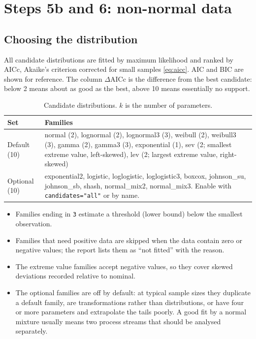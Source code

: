 \documentclass[a4paper,11pt,oneside,openany,parskip=half-,headings=standardclasses,toc=flat,numbers=noenddot]{scrbook}
\newcommand{\thead}[1]{{\sffamily\bfseries\footnotesize #1}}
\newcommand{\code}[1]{\texttt{\begingroup\def\_{\textunderscore\allowbreak}#1\endgroup}}
\begin{document}
\section{Steps 5b and 6: non-normal data}

\subsection{Choosing the distribution}\label{sec:aicc}
All candidate distributions are fitted by maximum likelihood and ranked by AICc, Akaike's criterion
corrected for small samples \cite{burnham} \eqref{eq:aicc}. AIC and BIC are shown for reference. The column $\Delta$AICc is the
difference from the best candidate: below 2 means about as good as the best, above 10 means essentially
no support.

\begin{table}[!htp]
\caption{Candidate distributions. $k$ is the number of parameters.}\label{tab:dists}
\small
\begin{tabularx}{\textwidth}{@{}P{15mm}L@{}}
\toprule
\thead{Set} & \thead{Families}\\
\midrule
Default (10) & normal (2), lognormal (2), lognormal3 (3), weibull (2), weibull3 (3), gamma (2), gamma3 (3),
  exponential (1), sev (2; smallest extreme value, left-skewed), lev (2; largest extreme value, right-skewed)\\
\addlinespace
Optional (10) & exponential2, logistic, loglogistic, loglogistic3, boxcox, johnson\_su, johnson\_sb, shash,
  normal\_mix2, normal\_mix3. Enable with \code{candidates="all"} or by name.\\
\bottomrule
\end{tabularx}
\end{table}

\begin{itemize}
\item Families ending in \code{3} estimate a threshold (lower bound) below the smallest observation.
\item Families that need positive data are skipped when the data contain zero or negative values; the
  report lists them as ``not fitted'' with the reason.
\item The extreme value families accept negative values, so they cover skewed deviations recorded
  relative to nominal.
\item The optional families are off by default: at typical sample sizes they duplicate a default
  family, are transformations rather than distributions, or have four or more parameters and
  extrapolate the tails poorly. A good fit by a normal mixture usually means two process streams that
  should be analysed separately.
\end{itemize}
\end{document}
